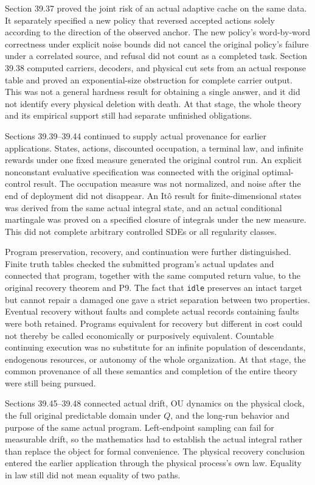 \documentclass[
  english,
  11pt,
  oneside]{book}
\begin{document}
Section 39.37 proved the joint risk of an actual adaptive cache on the same data. It separately specified a new policy that reversed accepted actions solely according to the direction of the observed anchor. The new policy's word-by-word correctness under explicit noise bounds did not cancel the original policy's failure under a correlated source, and refusal did not count as a completed task. Section 39.38 computed carriers, decoders, and physical cut sets from an actual response table and proved an exponential-size obstruction for complete carrier output. This was not a general hardness result for obtaining a single answer, and it did not identify every physical deletion with death. At that stage, the whole theory and its empirical support still had separate unfinished obligations.

Sections 39.39--39.44 continued to supply actual provenance for earlier applications. States, actions, discounted occupation, a terminal law, and infinite rewards under one fixed measure generated the original control run. An explicit nonconstant evaluative specification was connected with the original optimal-control result. The occupation measure was not normalized, and noise after the end of deployment did not disappear. An Itô result for finite-dimensional states was derived from the same actual integral state, and an actual conditional martingale was proved on a specified closure of integrals under the new measure. This did not complete arbitrary controlled SDEs or all regularity classes.

Program preservation, recovery, and continuation were further distinguished. Finite truth tables checked the submitted program's actual updates and connected that program, together with the same computed return value, to the original recovery theorem and P9. The fact that \texttt{idle} preserves an intact target but cannot repair a damaged one gave a strict separation between two properties. Eventual recovery without faults and complete actual records containing faults were both retained. Programs equivalent for recovery but different in cost could not thereby be called economically or purposively equivalent. Countable continuing execution was no substitute for an infinite population of descendants, endogenous resources, or autonomy of the whole organization. At that stage, the common provenance of all these semantics and completion of the entire theory were still being pursued.

Sections 39.45--39.48 connected actual drift, OU dynamics on the physical clock, the full original predictable domain under \(Q\), and the long-run behavior and purpose of the same actual program. Left-endpoint sampling can fail for measurable drift, so the mathematics had to establish the actual integral rather than replace the object for formal convenience. The physical recovery conclusion entered the earlier application through the physical process's own law. Equality in law still did not mean equality of two paths.
\end{document}
